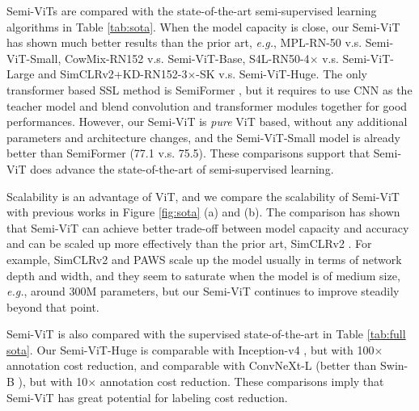 \documentclass{article}
\newcommand\eg{\emph{e.g.}}
\begin{document}
Semi-ViTs are compared with the state-of-the-art semi-supervised learning algorithms in Table \ref{tab:sota}. When the model capacity is close, our Semi-ViT has shown much better results than the prior art, \eg, MPL-RN-50 \cite{DBLP:conf/cvpr/PhamDXL21} v.s. Semi-ViT-Small, CowMix-RN152 \cite{DBLP:conf/visapp/FrenchOS22} v.s. Semi-ViT-Base, S4L-RN50-4$\times$ \cite{DBLP:conf/iccv/BeyerZOK19} v.s. Semi-ViT-Large and SimCLRv2+KD-RN152-3$\times$-SK \cite{DBLP:conf/nips/ChenKSNH20} v.s. Semi-ViT-Huge. The only transformer based SSL method is SemiFormer \cite{weng2021semi}, but it requires to use CNN as the teacher model and blend convolution and transformer modules together for good performances. However, our Semi-ViT is \emph{pure} ViT based, without any additional parameters and architecture changes, and the Semi-ViT-Small model is already better than SemiFormer (77.1 v.s. 75.5). These comparisons support that Semi-ViT does advance the state-of-the-art of semi-supervised learning.

Scalability is an advantage of ViT, and we compare the scalability of Semi-ViT with previous works in Figure \ref{fig:sota} (a) and (b). The comparison has shown that Semi-ViT can achieve better trade-off between model capacity and accuracy and can be scaled up more effectively than the prior art, SimCLRv2 \cite{DBLP:conf/nips/ChenKSNH20}. For example, SimCLRv2 and PAWS \cite{DBLP:conf/iccv/AssranCMBJBR21} scale up the model usually in terms of network depth and width, and they seem to saturate when the model is of medium size, \eg, around 300M parameters, but our Semi-ViT continues to improve steadily beyond that point. 

Semi-ViT is also compared with the supervised state-of-the-art in Table \ref{tab:full sota}. Our Semi-ViT-Huge is comparable with Inception-v4 \cite{DBLP:conf/aaai/SzegedyIVA17}, but with 100$\times$ annotation cost reduction, and comparable with ConvNeXt-L \cite{liu2022convnet} (better than Swin-B \cite{DBLP:conf/iccv/LiuL00W0LG21}), but with 10$\times$ annotation cost reduction. These comparisons imply that Semi-ViT has great potential for labeling cost reduction.
\end{document}
